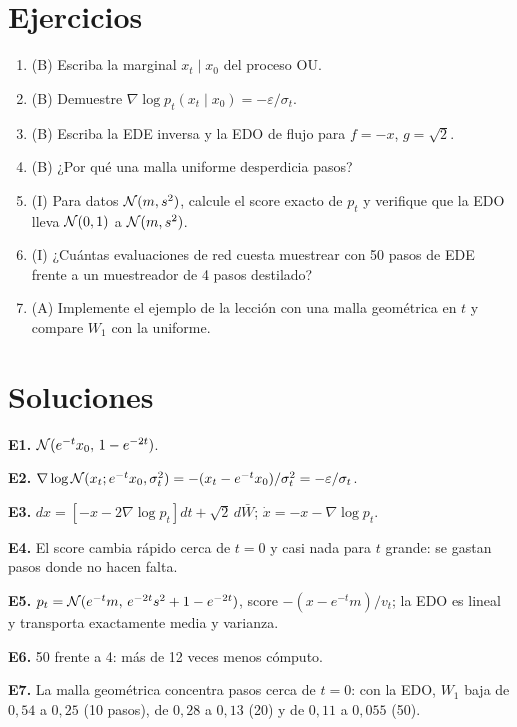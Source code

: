\documentclass[11pt,a4paper]{article}
\begin{document}
\section{Ejercicios}
\begin{enumerate}[label=\textbf{E\arabic*.}]
\item (B) Escriba la marginal $x_t\mid x_0$ del proceso OU.
\item (B) Demuestre $\nabla\log p_t(x_t\mid x_0)=-\varepsilon/\sigma_t$.
\item (B) Escriba la EDE inversa y la EDO de flujo para $f=-x$, $g=\sqrt2$.
\item (B) ¿Por qué una malla uniforme desperdicia pasos?
\item (I) Para datos $\mathcal{N}(m,s^2)$, calcule el score exacto de $p_t$ y verifique que la EDO lleva $\mathcal{N}(0,1)$ a $\mathcal{N}(m,s^2)$.
\item (I) ¿Cuántas evaluaciones de red cuesta muestrear con 50 pasos de EDE frente a un muestreador de 4 pasos destilado?
\item (A) Implemente el ejemplo de la lección con una malla geométrica en $t$ y compare $W_1$ con la uniforme.
\end{enumerate}
\section{Soluciones}
\begin{solucion}
\textbf{E1.} $\mathcal{N}(e^{-t}x_0,\,1-e^{-2t})$.

\textbf{E2.} $\nabla\log\mathcal{N}(x_t;e^{-t}x_0,\sigma_t^2)=-(x_t-e^{-t}x_0)/\sigma_t^2=-\varepsilon/\sigma_t$.

\textbf{E3.} $dx=[-x-2\nabla\log p_t]dt+\sqrt2\,d\bar W$; $\dot x=-x-\nabla\log p_t$.

\textbf{E4.} El score cambia rápido cerca de $t=0$ y casi nada para $t$ grande: se gastan pasos donde no hacen falta.

\textbf{E5.} $p_t=\mathcal{N}(e^{-t}m,\,e^{-2t}s^2+1-e^{-2t})$, score $-(x-e^{-t}m)/v_t$; la EDO es lineal y transporta exactamente media y varianza.

\textbf{E6.} 50 frente a 4: más de 12 veces menos cómputo.

\textbf{E7.} La malla geométrica concentra pasos cerca de $t=0$: con la EDO, $W_1$ baja de $0{,}54$ a $0{,}25$ (10 pasos), de $0{,}28$ a $0{,}13$ (20) y de $0{,}11$ a $0{,}055$ (50).
\end{solucion}
\end{document}
